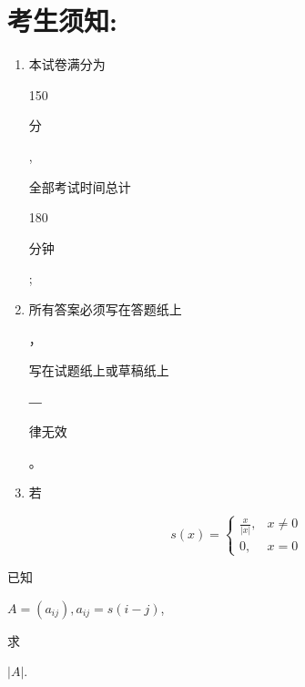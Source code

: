 \documentclass[10pt]{article}
\begin{document}
\section{考生须知:}
\begin{enumerate}
  \item \begin{CJK}{UTF8}{mj}本试卷满分为\end{CJK} 150 \begin{CJK}{UTF8}{mj}分\end{CJK}, \begin{CJK}{UTF8}{mj}全部考试时间总计\end{CJK} 180 \begin{CJK}{UTF8}{mj}分钟\end{CJK};

  \item \begin{CJK}{UTF8}{mj}所有答案必须写在答题纸上\end{CJK}，\begin{CJK}{UTF8}{mj}写在试题纸上或草稿纸上\end{CJK}―\begin{CJK}{UTF8}{mj}律无效\end{CJK}。

  \item \begin{CJK}{UTF8}{mj}若\end{CJK}

\end{enumerate}
$$
s(x)= \begin{cases}\frac{x}{|x|}, & x \neq 0 \\ 0, & x=0\end{cases}
$$
\begin{CJK}{UTF8}{mj}已知\end{CJK} $A=\left(a_{i j}\right), a_{i j}=s(i-j)$, \begin{CJK}{UTF8}{mj}求\end{CJK} $|A|$.
\end{document}
